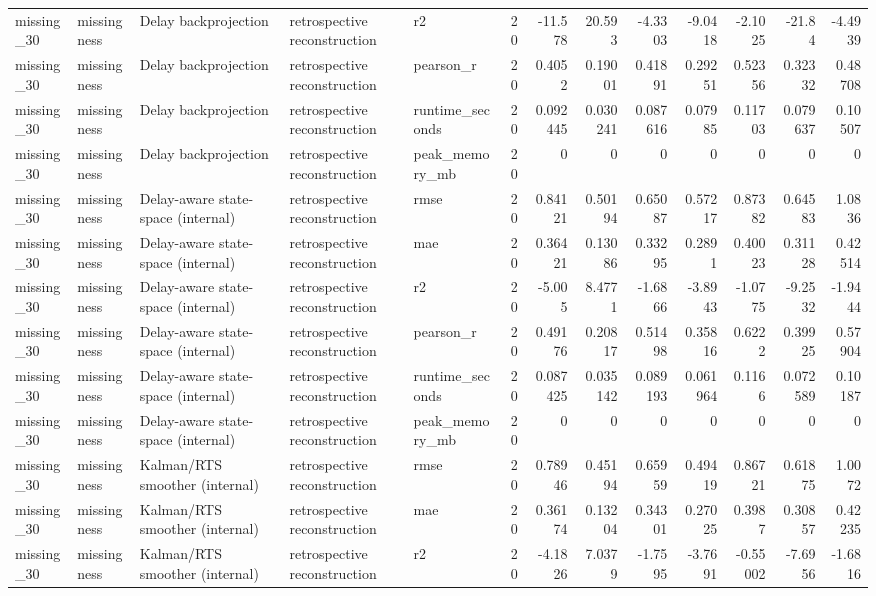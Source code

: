 \begin{table}[!htbp]
{{\begin{tabular}{lllllrrrrrrrr}
missing_30 & missingness & Delay backprojection & retrospective reconstruction & r2 & 20 & -11.578 & 20.593 & -4.3303 & -9.0418 & -2.1025 & -21.84 & -4.4939 \\
missing_30 & missingness & Delay backprojection & retrospective reconstruction & pearson_r & 20 & 0.4052 & 0.19001 & 0.41891 & 0.29251 & 0.52356 & 0.32332 & 0.48708 \\
missing_30 & missingness & Delay backprojection & retrospective reconstruction & runtime_seconds & 20 & 0.092445 & 0.030241 & 0.087616 & 0.07985 & 0.11703 & 0.079637 & 0.10507 \\
missing_30 & missingness & Delay backprojection & retrospective reconstruction & peak_memory_mb & 20 & 0 & 0 & 0 & 0 & 0 & 0 & 0 \\
missing_30 & missingness & Delay-aware state-space (internal) & retrospective reconstruction & rmse & 20 & 0.84121 & 0.50194 & 0.65087 & 0.57217 & 0.87382 & 0.64583 & 1.0836 \\
missing_30 & missingness & Delay-aware state-space (internal) & retrospective reconstruction & mae & 20 & 0.36421 & 0.13086 & 0.33295 & 0.2891 & 0.40023 & 0.31128 & 0.42514 \\
missing_30 & missingness & Delay-aware state-space (internal) & retrospective reconstruction & r2 & 20 & -5.005 & 8.4771 & -1.6866 & -3.8943 & -1.0775 & -9.2532 & -1.9444 \\
missing_30 & missingness & Delay-aware state-space (internal) & retrospective reconstruction & pearson_r & 20 & 0.49176 & 0.20817 & 0.51498 & 0.35816 & 0.6222 & 0.39925 & 0.57904 \\
missing_30 & missingness & Delay-aware state-space (internal) & retrospective reconstruction & runtime_seconds & 20 & 0.087425 & 0.035142 & 0.089193 & 0.061964 & 0.1166 & 0.072589 & 0.10187 \\
missing_30 & missingness & Delay-aware state-space (internal) & retrospective reconstruction & peak_memory_mb & 20 & 0 & 0 & 0 & 0 & 0 & 0 & 0 \\
missing_30 & missingness & Kalman/RTS smoother (internal) & retrospective reconstruction & rmse & 20 & 0.78946 & 0.45194 & 0.65959 & 0.49419 & 0.86721 & 0.61875 & 1.0072 \\
missing_30 & missingness & Kalman/RTS smoother (internal) & retrospective reconstruction & mae & 20 & 0.36174 & 0.13204 & 0.34301 & 0.27025 & 0.3987 & 0.30857 & 0.42235 \\
missing_30 & missingness & Kalman/RTS smoother (internal) & retrospective reconstruction & r2 & 20 & -4.1826 & 7.0379 & -1.7595 & -3.7691 & -0.55002 & -7.6956 & -1.6816 \\

\end{tabular}}}
\end{table}
